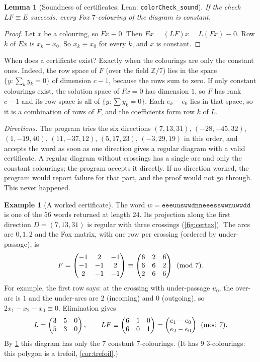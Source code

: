 \documentclass[11pt]{article}
\theoremstyle{plain}
\newtheorem{lemma}[theorem]{Lemma}
\theoremstyle{definition}
\newtheorem{example}[theorem]{Example}
\theoremstyle{remark}
\newcommand{\word}[1]{\texttt{#1}}
\newcommand{\Z}{\mathbb{Z}}
\newcommand{\lean}[1]{\texttt{#1}}
\begin{document}
\begin{lemma}[Soundness of certificates; Lean: \lean{colorCheck\_sound}]\label{lem:certsound}
If the check $LF\equiv E$ succeeds, every Fox $7$-colouring of the diagram is constant.
\end{lemma}
\begin{proof}
Let $x$ be a colouring, so $Fx\equiv0$. Then $Ex=(LF)x=L(Fx)\equiv0$. Row $k$ of $Ex$ is
$x_k-x_0$. So $x_k\equiv x_0$ for every $k$, and $x$ is constant.
\end{proof}

When does a certificate exist? Exactly when the colourings are only the constant ones. Indeed, the row
space of $F$ (over the field $\Z/7$) lies in the space $\{y:\sum_k y_k=0\}$ of dimension $c-1$, because
the rows sum to zero. If only constant colourings exist, the solution space of $Fx=0$ has dimension $1$,
so $F$ has rank $c-1$ and its row space is all of $\{y:\sum y_k=0\}$. Each $e_k-e_0$ lies in that space,
so it is a combination of rows of $F$, and the coefficients form row $k$ of $L$.

\emph{Directions.} The program tries the six directions
$(7,13,31)$, $(-28,-45,32)$, $(1,-19,40)$, $(11,-37,12)$, $(5,17,23)$, $(-3,29,19)$ in this order, and
accepts the word as soon as one direction gives a regular diagram with a valid certificate. A regular
diagram without crossings has a single arc and only the constant colourings; the program accepts it
directly. If no
direction worked, the program would report failure for that part, and the proof would not go through.
This never happened.

\begin{example}[A worked certificate]\label{ex:cert}
The word $w=\word{eeeuuswwdnneeesswwnuwwdd}$ is one of the $56$ words returned at length $24$. Its
projection along the first direction $D=(7,13,31)$ is regular with three crossings
(\cref{fig:certex}). The arcs are $0,1,2$ and the Fox matrix, with one row per crossing (ordered by
under-passage), is
\[ F=\begin{pmatrix}-1&2&-1\\-1&-1&2\\2&-1&-1\end{pmatrix}\equiv\begin{pmatrix}6&2&6\\6&6&2\\2&6&6\end{pmatrix}\pmod7. \]
For example, the first row says: at the crossing with under-passage $u_0$, the over-arc is $1$ and the
under-arcs are $2$ (incoming) and $0$ (outgoing), so $2x_1-x_2-x_0\equiv0$. Elimination gives
\[ L=\begin{pmatrix}3&5&0\\5&3&0\end{pmatrix}, \qquad LF\equiv\begin{pmatrix}6&1&0\\6&0&1\end{pmatrix}=\begin{pmatrix}e_1-e_0\\ e_2-e_0\end{pmatrix}\pmod 7. \]
By \cref{lem:certsound} this diagram has only the $7$ constant $7$-colourings. (It has $9$
$3$-colourings: this polygon is a trefoil, \cref{cor:trefoil}.)
\end{example}
\end{document}
